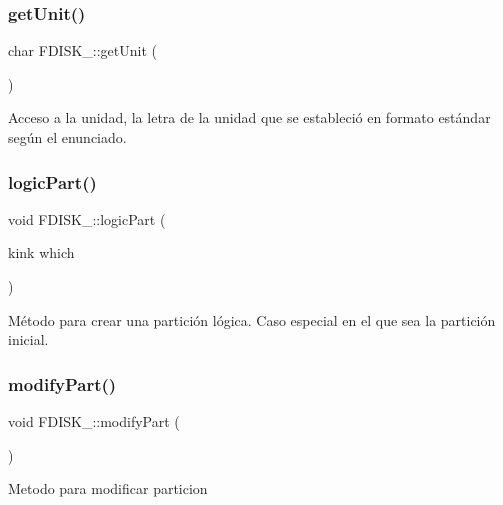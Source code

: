 \subsubsection{\texorpdfstring{get\+Unit()}{getUnit()}}
{\footnotesize\ttfamily char F\+D\+I\+S\+K\+\_\+\+::get\+Unit (\begin{DoxyParamCaption}{ }\end{DoxyParamCaption})\hspace{0.3cm}{\ttfamily [inline]}}

Acceso a la unidad, la letra de la unidad que se estableció en formato estándar según el enunciado. \mbox{\label{classFDISK___aabd69e0175b1950638c51ccf26cb0dcb}} 
\subsubsection{\texorpdfstring{logic\+Part()}{logicPart()}}
{\footnotesize\ttfamily void F\+D\+I\+S\+K\+\_\+\+::logic\+Part (\begin{DoxyParamCaption}\item[{kink}]{which }\end{DoxyParamCaption})\hspace{0.3cm}{\ttfamily [inline]}}

Método para crear una partición lógica. Caso especial en el que sea la partición inicial. \mbox{\label{classFDISK___a926ec9e4cadf17773cc630e0423af3db}} 
\subsubsection{\texorpdfstring{modify\+Part()}{modifyPart()}}
{\footnotesize\ttfamily void F\+D\+I\+S\+K\+\_\+\+::modify\+Part (\begin{DoxyParamCaption}{ }\end{DoxyParamCaption})\hspace{0.3cm}{\ttfamily [inline]}}

Metodo para modificar particion \mbox{\label{classFDISK___a34427ce807ae61a1e0b101bb2a69b581}} 
